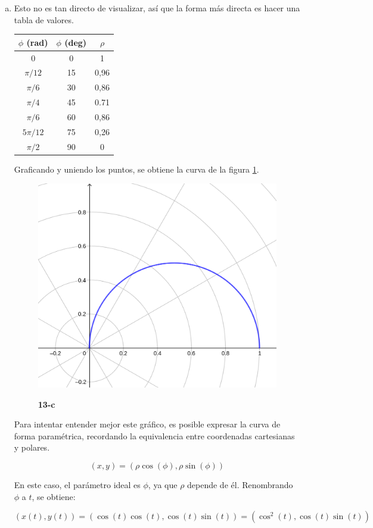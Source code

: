 \documentclass{article}
\begin{document}
\begin{enumerate}[(a)]
\item Esto no es tan directo de visualizar, así que la forma más directa es hacer una tabla de valores.

\begin{center}
\begin{tabular}{ |c|c|c| }
 \hline
 $\phi$ (rad) & $\phi$ (deg) & $\rho$ \\ [0.5ex] 
 \hline\hline
 \hline
 0 & 0 & 1 \\ 
 $\pi/12$ & 15 & 0,96 \\ 
 $\pi/6$ & 30 & 0,86 \\
 $\pi/4$ & 45 & 0.71 \\
 $\pi/6$ & 60 & 0,86 \\
 $5\pi/12$ & 75 & 0,26 \\
 $\pi/2$ & 90 & 0 \\
 \hline
\end{tabular}
\end{center}

Graficando y uniendo los puntos, se obtiene la curva de la figura \ref{fig:1-13-c}.

\begin{figure}[ht]
\caption{\textbf{13-c}}
\includegraphics[scale=4.5]{img/ejercicios/1/13-c.png} 
\centering
\label{fig:1-13-c}
\end{figure}

Para intentar entender mejor este gráfico, es posible expresar la curva de forma paramétrica, recordando la equivalencia entre coordenadas cartesianas y polares.

\begin{equation}
(x, y) = (\rho \cos(\phi), \rho \sin(\phi))
\end{equation}

En este caso, el parámetro ideal es $\phi$, ya que $\rho$ depende de él. Renombrando $\phi$ a $t$, se obtiene:

\begin{equation}
(x(t), y(t)) = (\cos(t) \cos(t), \cos(t)\sin(t)) = (\cos^2(t), \cos(t) \sin(t))
\end{equation}

\end{enumerate}
\end{document}

